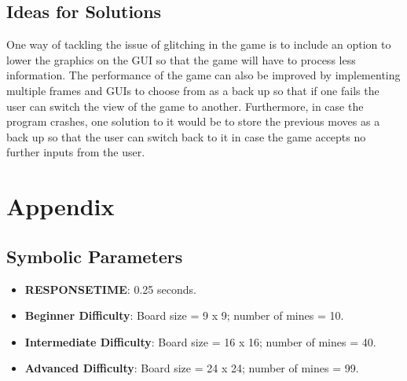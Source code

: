 \documentclass[12pt, titlepage]{article}
\begin{document}
\subsection{Ideas for Solutions}

One way of tackling the issue of glitching in the game is to include an option to lower the graphics on the GUI so that the game will
have to process less information. The performance of the game can also be improved by implementing multiple frames and GUIs to
choose from as a back up so that if one fails the user can switch the view of the game to another. Furthermore, in case the program
crashes, one solution to it would be to store the previous moves as a back up so that the user can switch back to it in case the game
accepts no further inputs from the user.





\newpage

\section{Appendix}
\subsection{Symbolic Parameters}

\begin{itemize}
	\item \textbf{RESPONSETIME}: 0.25 seconds.
	\item \textbf{Beginner Difficulty}: Board size = 9 x 9; number of mines = 10.
	\item \textbf{Intermediate Difficulty}: Board size = 16 x 16; number of mines = 40.
	\item \textbf{Advanced Difficulty}: Board size = 24 x 24; number of mines = 99.
\end{itemize}
\end{document}
